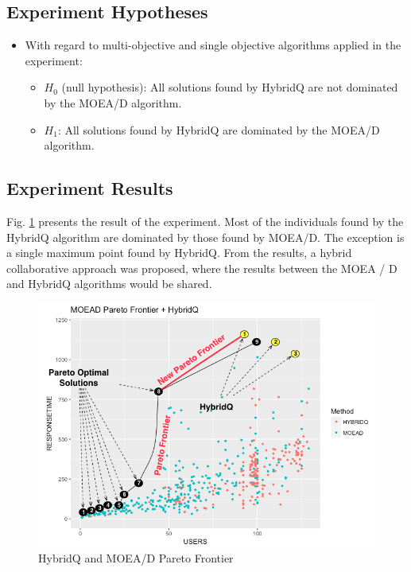 \documentclass[espaco=umemeio,chapter=TITLE,twoside,openright]{abnt}
\begin{document}
\subsection{Experiment Hypotheses}

\begin{itemize}
\item With regard to multi-objective and single objective algorithms applied in the experiment:
\begin{itemize}
\item $H_{0}$ (null hypothesis): All solutions found by HybridQ are not dominated by the MOEA/D algorithm.
\item $H_{1}$: All solutions found by HybridQ are dominated by the MOEA/D algorithm.
\end{itemize}
\end{itemize}

\subsection{Experiment Results}

Fig. \ref{fig:singlewithmulti} presents the result of the experiment. Most of the individuals found by the HybridQ algorithm are dominated by those found by MOEA/D. The exception is a single maximum point found by HybridQ. From the results, a hybrid collaborative approach was proposed, where the results between the MOEA / D and HybridQ algorithms would be shared. 


\begin{figure}[h]
\centering
\includegraphics[width=1\textwidth]{./images/singlewithmulti.png}
    \caption{HybridQ and MOEA/D Pareto Frontier}
\label{fig:singlewithmulti}
\end{figure}
\end{document}
